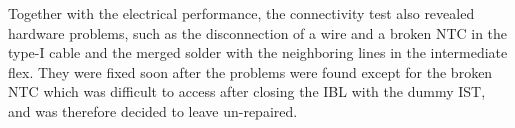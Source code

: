 Together with the electrical performance, the connectivity test also revealed hardware problems, such as the disconnection of a wire and a broken NTC in the type-I cable and the merged solder with the neighboring lines in the intermediate flex. They were fixed soon after the problems were found except for the broken NTC which was difficult to access after closing the IBL with the dummy IST, and was therefore decided to leave un-repaired.






